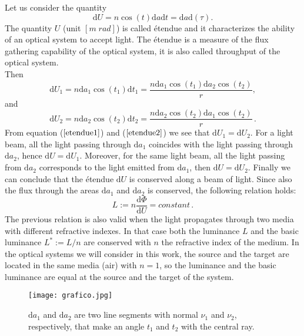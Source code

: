 Let us consider the quantity
\begin{equation}\label{etendue}
\textrm{d}U = n \cos(t)\textrm{d}a\textrm{d}t= \textrm{d}a\textrm{d}(\tau).
\end{equation}
The quantity $U$ (unit $[m\; rad]$) is called \'{e}tendue and it characterizes the ability of an optical system to accept light. The \'{e}tendue is a measure of the flux gathering capability of the optical system, it is also called throughput of the optical system.\\
Then \begin{equation}
\label{etendue1}
\textrm{d}U_1 = n \textrm{d}a_1\cos(t_1)\textrm{d}t_1= \frac{n \textrm{d}a_1\cos(t_1)\textrm{d}a_2\cos(t_2)}{r},
\end{equation}
and
\begin{equation}
\label{etendue2}
\textrm{d}U_2 = n \textrm{d}a_2\cos(t_2)\textrm{d}t_2= \frac{ n \textrm{d}a_2\cos(t_2)\textrm{d}a_1\cos(t_2)}{r}\,.
\end{equation}
From equation ($\ref{etendue1}$) and ($\ref{etendue2}$) we see that $\textrm{d}U_1=\textrm{d}U_2$.
For a light beam, all the light passing through $\textrm{d}a_1$ coincides with the light passing through $\textrm{d}a_2$, hence $\textrm{d}U = \textrm{d}U_1$. Moreover, for the same light beam, all the light passing from $\textrm{d}a_2$ corresponds to the light emitted from $\textrm{d}a_1$, then $\textrm{d}U=\textrm{d}U_2$. Finally we can conclude that the \'{e}tendue $\textrm{d}U$ is conserved along a beam of light. Since also the flux through the areas $\textrm{d}a_1$ and $\textrm{d}a_2$ is conserved, the following relation holds:
\begin{equation}\label{basicluminance}
L := n \frac{\textrm{d}\Phi}{\textrm{d}U} = constant\,.
\end{equation}
The previous relation is also valid when the light propagates through two media with different refractive indexes. In that case both the luminance $L$ and the basic luminance $L^*:= L/n$ are conserved with $n$ the refractive index of the medium. In the optical systems we will consider in this work, the source and the target are located in the same media (air) with $n=1$, so the luminance and the basic luminance are equal at the source and the target of the system.\\
\begin{figure}[htbp]
 \label{fig:grafico}
     \begin{center}
     \texttt{[image: grafico.jpg]}
     \end{center}
     \caption{\footnotesize{$\textrm{d}a_1$ and $\textrm{d}a_2$ are two line segments with normal $\nu_1$ and $\nu_2$, respectively, that make an angle $t_1$ and $t_2$ with the central ray.}}
\label{fig:rays}
 \end{figure}

